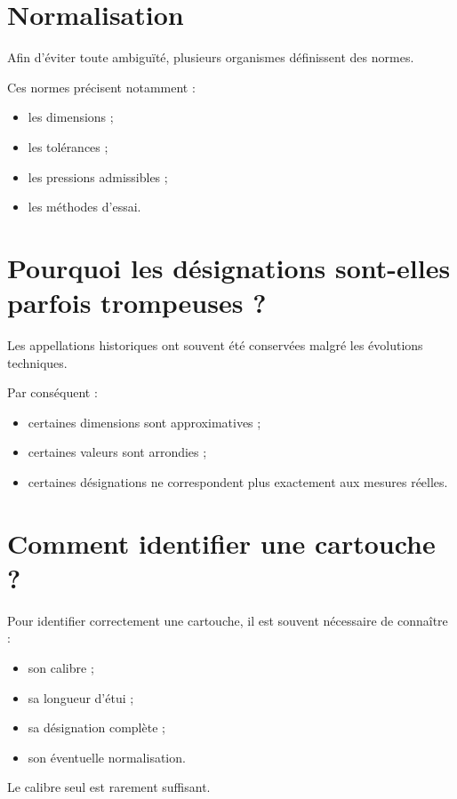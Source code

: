 \section{Normalisation}

Afin d'éviter toute ambiguïté, plusieurs organismes définissent des normes.

Ces normes précisent notamment :

\begin{itemize}
    \item les dimensions ;
    \item les tolérances ;
    \item les pressions admissibles ;
    \item les méthodes d'essai.
\end{itemize}

\section{Pourquoi les désignations sont-elles parfois trompeuses ?}

Les appellations historiques ont souvent été conservées malgré les évolutions
techniques.

Par conséquent :

\begin{itemize}
    \item certaines dimensions sont approximatives ;
    \item certaines valeurs sont arrondies ;
    \item certaines désignations ne correspondent plus exactement aux mesures
          réelles.
\end{itemize}

\section{Comment identifier une cartouche ?}

Pour identifier correctement une cartouche, il est souvent nécessaire de
connaître :

\begin{itemize}
    \item son calibre ;
    \item sa longueur d'étui ;
    \item sa désignation complète ;
    \item son éventuelle normalisation.
\end{itemize}

Le calibre seul est rarement suffisant.


